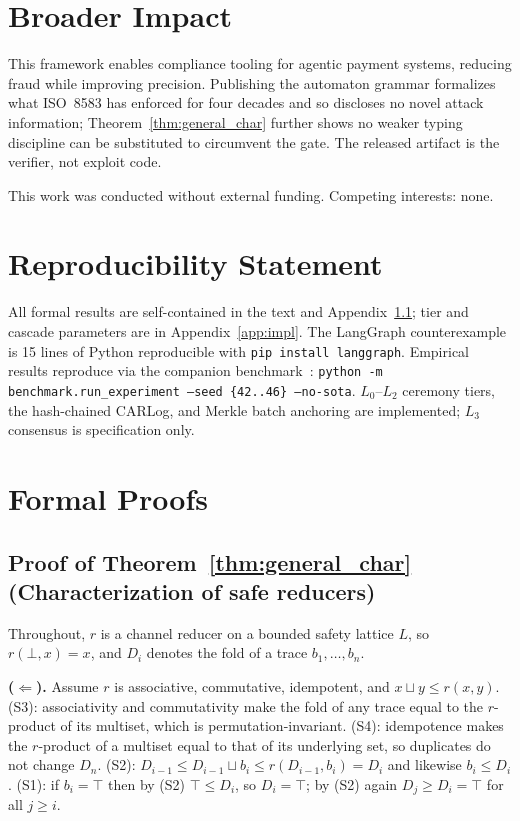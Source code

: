 \documentclass{article}
\begin{document}
\section*{Broader Impact}

This framework enables compliance tooling for agentic payment systems, reducing fraud while
improving precision. Publishing the automaton grammar formalizes what ISO~8583 has enforced for
four decades and so discloses no novel attack information; Theorem~\ref{thm:general_char}
further shows no weaker typing discipline can be substituted to circumvent the gate. The
released artifact is the verifier, not exploit code.

\begin{ack}
This work was conducted without external funding. Competing interests: none.
\end{ack}

\section*{Reproducibility Statement}

All formal results are self-contained in the text and Appendix~\ref{app:general_char}; tier and
cascade parameters are in Appendix~\ref{app:impl}. The LangGraph counterexample is 15 lines of
Python reproducible with \texttt{pip install langgraph}. Empirical results reproduce via the
companion benchmark~\cite{acpbench}:
\texttt{python -m benchmark.run\_experiment --seed \{42..46\} --no-sota}.
$L_0$--$L_2$ ceremony tiers, the hash-chained CARLog, and Merkle batch anchoring are
implemented; $L_3$ consensus is specification only.


\appendix

\section{Formal Proofs}

\subsection{Proof of Theorem~\ref{thm:general_char} (Characterization of safe reducers)}
\label{app:general_char}

Throughout, $r$ is a channel reducer on a bounded safety lattice $L$, so $r(\bot,x)=x$, and
$D_i$ denotes the fold of a trace $b_1,\dots,b_n$.

\textbf{($\Leftarrow$).} Assume $r$ is associative, commutative, idempotent, and $x\sqcup y\le r(x,y)$.
(S3): associativity and commutativity make the fold of any trace equal to the $r$-product of its
multiset, which is permutation-invariant. (S4): idempotence makes the $r$-product of a multiset
equal to that of its underlying set, so duplicates do not change $D_n$. (S2): $D_{i-1}\le
D_{i-1}\sqcup b_i\le r(D_{i-1},b_i)=D_i$ and likewise $b_i\le D_i$. (S1): if $b_i=\top$ then by
(S2) $\top\le D_i$, so $D_i=\top$; by (S2) again $D_j\ge D_i=\top$ for all $j\ge i$.
\end{document}
